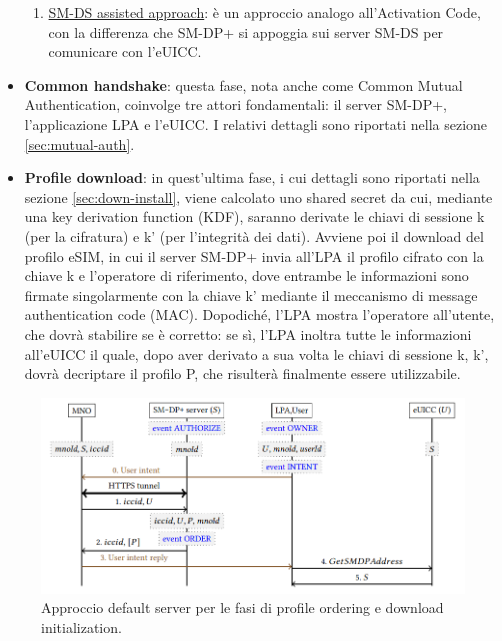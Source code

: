 \documentclass[10pt, oneside]{book}
\begin{document}
\begin{itemize}
\begin{enumerate}
\item \underline{SM-DS assisted approach}: è un approccio analogo all'Activation Code, con la differenza che SM-DP+ si appoggia sui server SM-DS per comunicare con l'eUICC.
\end{enumerate}
\item \textbf{Common handshake}: questa fase, nota anche come Common Mutual Authentication, coinvolge tre attori fondamentali: il server SM-DP+, l'applicazione LPA e l'eUICC. I relativi dettagli sono riportati nella sezione \ref{sec:mutual-auth}.
\item \textbf{Profile download}: in quest'ultima fase, i cui dettagli sono riportati nella sezione \ref{sec:down-install}, viene calcolato uno shared secret da cui, mediante una key derivation function (KDF), saranno derivate le chiavi di sessione k (per la cifratura) e k' (per l'integrità dei dati). Avviene poi il download del profilo eSIM, in cui il server SM-DP+ invia all'LPA il profilo cifrato con la chiave k e l'operatore di riferimento, dove entrambe le informazioni sono firmate singolarmente con la chiave k' mediante il meccanismo di message authentication code (MAC). Dopodiché, l'LPA mostra l'operatore all'utente, che dovrà stabilire se è corretto: se sì, l'LPA inoltra tutte le informazioni all'eUICC il quale, dopo aver derivato a sua volta le chiavi di sessione k, k', dovrà decriptare il profilo P, che risulterà finalmente essere utilizzabile.
\end{itemize}
\begin{figure}
\includegraphics[width=\linewidth]{default-server.png}
\caption{Approccio default server per le fasi di profile ordering e download initialization.}
\label{fig:default-server}
\end{figure}
\end{document}
